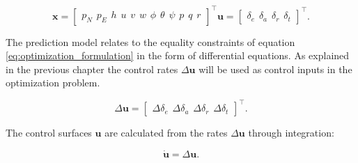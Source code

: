 \begin{subequations}
\begin{equation}
	\label{eq:uav_states}
	\mathbf{x} =
	\begin{bmatrix}
		p_N \hspace{5pt} p_E \hspace{5pt} h \hspace{5pt}
		u \hspace{5pt} v \hspace{5pt} w \hspace{5pt}
		\phi \hspace{5pt} \theta \hspace{5pt} \psi \hspace{5pt}
		p \hspace{5pt} q \hspace{5pt} r
	\end{bmatrix}^\intercal
\end{equation}
\begin{equation}
	\mathbf{u} =
	\begin{bmatrix}
		\delta_e \hspace{5pt} \delta_a \hspace{5pt} \delta_r \hspace{5pt} \delta_t
	\end{bmatrix}^\intercal.
\end{equation}
\end{subequations}

The prediction model relates to the equality constraints of equation \ref{eq:optimization_formulation} in the form of differential equations. As explained in the previous chapter the control rates $\Delta \mathbf{u}$ will be used as control inputs in the optimization problem.

\begin{equation}
	\label{eq:control_rates}
	\Delta\mathbf{u} = 
	\begin{bmatrix}
		\Delta\delta_e \hspace{5pt} \Delta\delta_a \hspace{5pt} \Delta\delta_r \hspace{5pt} \Delta\delta_t
	\end{bmatrix} ^\intercal .
\end{equation}

The control surfaces $\mathbf{u}$ are calculated from the rates $\Delta\mathbf{u}$ through integration:

\begin{equation}
	\label{eq:control_relation}
	\mathbf{\dot{u}} = \Delta\mathbf{u}.
\end{equation}



